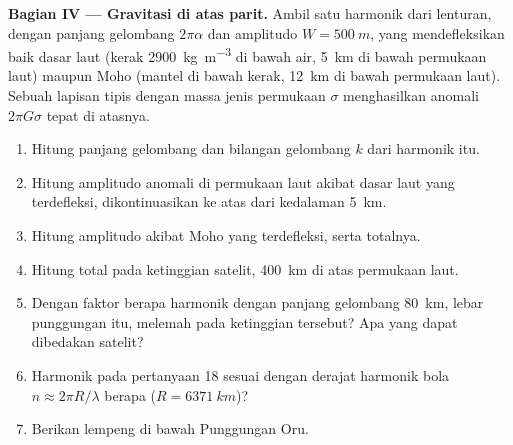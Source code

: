 \begin{problem}
\noindent\textbf{Bagian IV --- Gravitasi di atas parit.} Ambil satu harmonik dari
lenturan, dengan panjang gelombang $2\pi\alpha$ dan amplitudo $W = \qty{500}{m}$, yang mendefleksikan
baik dasar laut (kerak \qty{2900}{kg.m^{-3}} di bawah air, \qty{5}{km} di bawah
permukaan laut) maupun Moho (mantel di bawah kerak, \qty{12}{km} di bawah permukaan laut). Sebuah
lapisan tipis dengan massa jenis permukaan $\sigma$ menghasilkan anomali $2\pi G\sigma$
tepat di atasnya.
\begin{enumerate}[resume]
  \item Hitung panjang gelombang dan bilangan gelombang $k$ dari harmonik itu.
  \item Hitung amplitudo anomali di permukaan laut akibat dasar laut yang
        terdefleksi, dikontinuasikan ke atas dari kedalaman \qty{5}{km}.
  \item Hitung amplitudo akibat Moho yang terdefleksi, serta totalnya.
  \item Hitung total pada ketinggian satelit, \qty{400}{km} di atas permukaan
        laut.
  \item Dengan faktor berapa harmonik dengan panjang gelombang \qty{80}{km}, lebar
        punggungan itu, melemah pada ketinggian tersebut? Apa yang dapat dibedakan satelit?
  \item Harmonik pada pertanyaan 18 sesuai dengan derajat harmonik bola $n \approx 2\pi R/\lambda$
        berapa ($R = \qty{6371}{km}$)?
  \item Berikan  lempeng di bawah Punggungan
        Oru.
\end{enumerate}
\end{problem}
